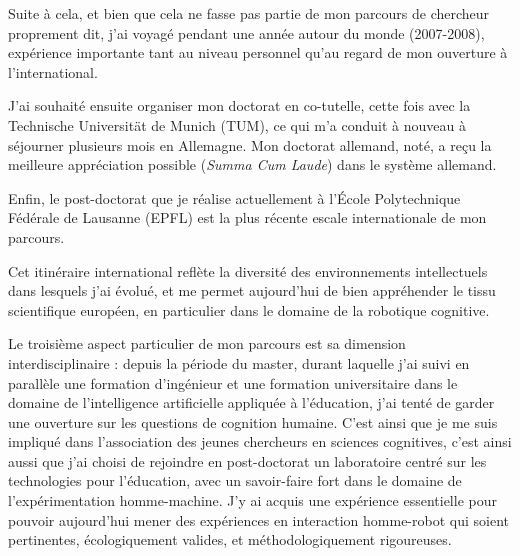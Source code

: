 \documentclass[a4paper]{article}
\begin{document}
Suite à cela, et bien que cela ne fasse pas partie de mon parcours de chercheur
proprement dit, j'ai voyagé pendant une année autour du monde (2007-2008),
expérience importante tant au niveau personnel qu'au regard de mon ouverture à
l'international.

J'ai souhaité ensuite organiser mon doctorat en co-tutelle, cette
fois avec la Technische Universität de Munich (TUM), ce qui m'a conduit à
nouveau à séjourner plusieurs mois en Allemagne. Mon doctorat allemand, noté, a
reçu la meilleure appréciation possible (\emph{Summa Cum Laude}) dans le système
allemand.

Enfin, le post-doctorat que je réalise actuellement à l'École Polytechnique
Fédérale de Lausanne (EPFL) est la plus récente escale internationale de mon
parcours.

Cet itinéraire international reflète la diversité des environnements
intellectuels dans lesquels j'ai évolué, et me permet aujourd'hui de bien
appréhender le tissu scientifique européen, en particulier dans le domaine de la
robotique cognitive.

Le troisième aspect particulier de mon parcours est sa dimension
interdisciplinaire : depuis la période du master, durant laquelle j'ai suivi en
parallèle une formation d'ingénieur et une formation universitaire dans le
domaine de l'intelligence artificielle appliquée à l'éducation, j'ai tenté de
garder une ouverture sur les questions de cognition humaine. C'est ainsi que je
me suis impliqué dans l'association des jeunes chercheurs en sciences
cognitives, c'est ainsi aussi que j'ai choisi de rejoindre en post-doctorat un
laboratoire centré sur les technologies pour l'éducation, avec un savoir-faire
fort dans le domaine de l'expérimentation homme-machine. J'y ai acquis une
expérience essentielle pour pouvoir aujourd'hui mener des expériences en
interaction homme-robot qui soient pertinentes, écologiquement valides, et
méthodologiquement rigoureuses.

\printbibliography

\end{document}
